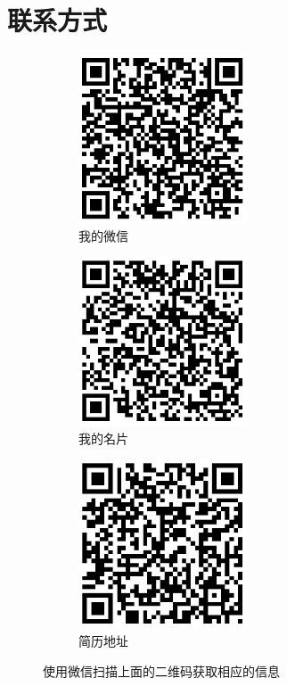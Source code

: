 \documentclass[letterpaper,11pt,nofonts]{ctexart}
\begin{document}
\section{\textbf{联系方式}}
  \begin{figure}[h]
    \begin{subfigure}{0.33\textwidth}
      \includegraphics[width=0.9\linewidth, height=5cm]{weixin.png} 
      \caption{我的微信}
      \label{fig:subim1}
    \end{subfigure}
    \begin{subfigure}{0.33\textwidth}
      \includegraphics[width=0.9\linewidth, height=5cm]{vcard.png}
      \caption{我的名片}
      \label{fig:subim2}
    \end{subfigure}
    \begin{subfigure}{0.33\textwidth}
      \includegraphics[width=0.9\linewidth, height=5cm]{resume-url.png}
      \caption{简历地址}
      \label{fig:subim3}
    \end{subfigure}
    
    \caption{使用微信扫描上面的二维码获取相应的信息}
    \label{fig:image1}
  \end{figure}

\end{document}
